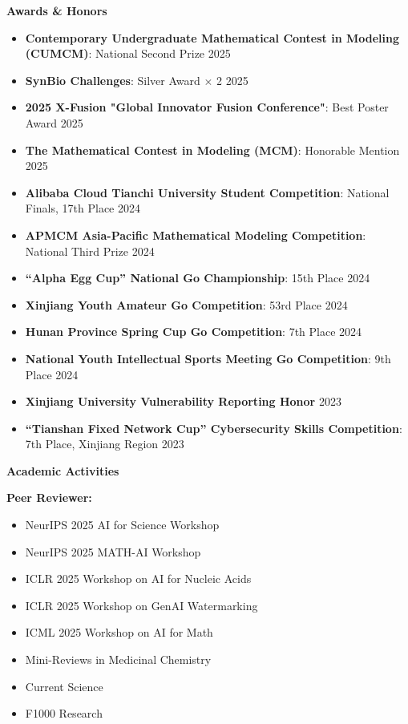 \documentclass[11pt]{article}
\begin{document}
	\vspace{12pt}
	
	\begin{center}
		\textbf{\large Awards \& Honors}
	\end{center}
	\begin{itemize}[noitemsep, topsep=0pt, partopsep=0pt, parsep=0pt, leftmargin=*]
		\item \textbf{Contemporary Undergraduate Mathematical Contest in Modeling (CUMCM)}: National Second Prize \hfill 2025
		\item \textbf{SynBio Challenges}: Silver Award $\times$ 2 \hfill 2025
		\item \textbf{2025 X-Fusion "Global Innovator Fusion Conference"}: Best Poster Award \hfill 2025
		\item \textbf{The Mathematical Contest in Modeling (MCM)}: Honorable Mention \hfill 2025
		\item \textbf{Alibaba Cloud Tianchi University Student Competition}: National Finals, 17th Place \hfill 2024
		\item \textbf{APMCM Asia-Pacific Mathematical Modeling Competition}: National Third Prize \hfill 2024
		\item \textbf{“Alpha Egg Cup” National Go Championship}: 15th Place \hfill 2024
		\item \textbf{Xinjiang Youth Amateur Go Competition}: 53rd Place \hfill 2024
		\item \textbf{Hunan Province Spring Cup Go Competition}: 7th Place \hfill 2024
		\item \textbf{National Youth Intellectual Sports Meeting Go Competition}: 9th Place \hfill 2024
		\item \textbf{Xinjiang University Vulnerability Reporting Honor} \hfill 2023
		\item \textbf{“Tianshan Fixed Network Cup” Cybersecurity Skills Competition}: 7th Place, Xinjiang Region \hfill 2023
	\end{itemize}

	\begin{center}
		\textbf{\large Academic Activities}
	\end{center}
	\textbf{Peer Reviewer:}
	\begin{multicols}{2}
		\begin{itemize}[noitemsep, topsep=0pt, partopsep=0pt, parsep=0pt, leftmargin=*]
			\item NeurIPS 2025 AI for Science Workshop
			\item NeurIPS 2025 MATH-AI Workshop
			\item ICLR 2025 Workshop on AI for Nucleic Acids
			\item ICLR 2025 Workshop on GenAI Watermarking
			\item ICML 2025 Workshop on AI for Math
			\item Mini-Reviews in Medicinal Chemistry
			\item Current Science
			\item F1000 Research
		\end{itemize}
	\end{multicols}
	
\end{document}
